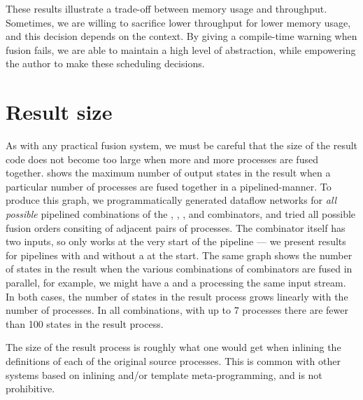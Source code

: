 These results illustrate a trade-off between memory usage and throughput.
Sometimes, we are willing to sacrifice lower throughput for lower memory usage, and this decision depends on the context.
By giving a compile-time warning when fusion fails, we are able to maintain a high level of abstraction, while empowering the author to make these scheduling decisions.

\section{Result size}
\label{s:Benchmarks:ResultSize}

As with any practical fusion system, we must be careful that the size of the result code does not become too large when more and more processes are fused together.
 shows the maximum number of output states in the result when a particular number of processes are fused together in a pipelined-manner.
To produce this graph, we programmatically generated dataflow networks for \emph{all possible} pipelined combinations of the \Hs@map@, \Hs@filter@, \Hs@scan@, \Hs@group@ and \Hs@join@ combinators, and tried all possible fusion orders consiting of adjacent pairs of processes.
The \Hs@join@ combinator itself has two inputs, so only works at the very start of the pipeline --- we present results for pipelines with and without a \Hs@join@ at the start.
The same graph shows the number of states in the result when the various combinations of combinators are fused in parallel, for example, we might have a \Hs@map@ and a \Hs@filter@ processing the same input stream.
In both cases, the number of states in the result process grows linearly with the number of processes. In all combinations, with up to 7 processes there are fewer than 100 states in the result process. 




The size of the result process is roughly what one would get when inlining the definitions of each of the original source processes. This is common with other systems based on inlining and/or template meta-programming, and is not prohibitive.

